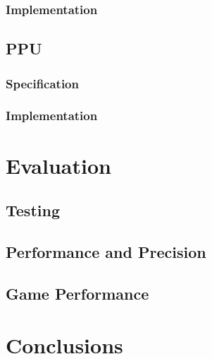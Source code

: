 \documentclass[]{report}
\begin{document}
\subsection{Implementation}

\section{PPU}

\subsection{Specification}

\subsection{Implementation}

\chapter{Evaluation}

\section {Testing}

\section{Performance and Precision}

\section{Game Performance}

\chapter{Conclusions}

\printbibliography
\end{document}
